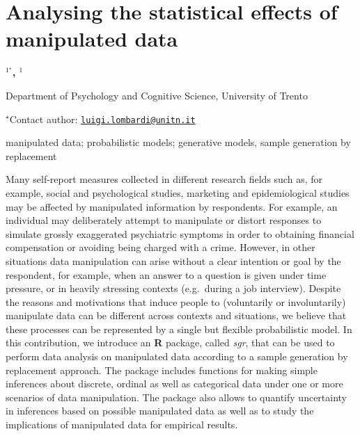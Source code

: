 \documentclass[\main/boa.tex]{subfiles}
\begin{document}
\section{Analysing the statistical effects of manipulated data}

\begin{center}
  {\bf {}$^{1^\star}$, $^{1}$}
\end{center}

\vskip 0.3cm

\begin{affiliations}
\begin{enumerate}
\begin{minipage}{0.915\textwidth}
\centering
\item Department of Psychology and Cognitive Science, University of Trento \\[-2pt]
\end{minipage}
\end{enumerate}
$^\star$Contact author: \href{mailto:luigi.lombardi@unitn.it}{\nolinkurl{luigi.lombardi@unitn.it}}\\
\end{affiliations}

\vskip 0.5cm

\begin{minipage}{0.915\textwidth}
\keywords manipulated data; probabilistic models; generative models, sample
generation by replacement
\end{minipage}

\vskip 0.8cm

Many self-report measures collected in different research fields such
as, for example, social and psychological studies, marketing and
epidemiological studies may be affected by manipulated information by
respondents. For example, an individual may deliberately attempt to
manipulate or distort responses to simulate grossly exaggerated
psychiatric symptoms in order to obtaining financial compensation or
avoiding being charged with a crime. However, in other situations data
manipulation can arise without a clear intention or goal by the
respondent, for example, when an answer to a question is given under
time pressure, or in heavily stressing contexts (e.g.~during a job
interview). Despite the reasons and motivations that induce people to
(voluntarily or involuntarily) manipulate data can be different across
contexts and situations, we believe that these processes can be
represented by a single but flexible probabilistic model. In this
contribution, we introduce an \textbf{R} package, called \emph{sgr},
that can be used to perform data analysis on manipulated data according
to a sample generation by replacement approach. The package includes
functions for making simple inferences about discrete, ordinal as well
as categorical data under one or more scenarios of data manipulation.
The package also allows to quantify uncertainty in inferences based on
possible manipulated data as well as to study the implications of
manipulated data for empirical results.
\end{document}
